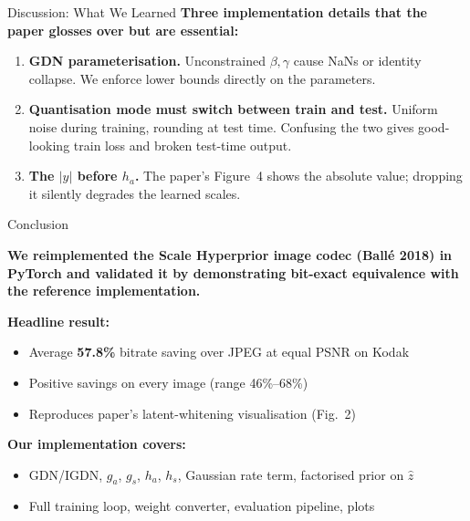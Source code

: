 \documentclass[aspectratio=169, 12pt]{beamer}
\begin{document}
\begin{frame}{Discussion: What We Learned}
    \textbf{Three implementation details that the paper glosses over but are essential:}
    \begin{enumerate}
        \setlength\itemsep{0.7em}
        \item \textbf{GDN parameterisation.} Unconstrained $\beta, \gamma$ cause NaNs or identity collapse. We enforce lower bounds directly on the parameters.
        \item \textbf{Quantisation mode must switch between train and test.} Uniform noise during training, rounding at test time. Confusing the two gives good-looking train loss and broken test-time output.
        \item \textbf{The $|y|$ before $h_a$.} The paper's Figure~4 shows the absolute value; dropping it silently degrades the learned scales.
    \end{enumerate}
\end{frame}

\begin{frame}{Conclusion}
    \begin{keypoint}
    \textbf{We reimplemented the Scale Hyperprior image codec (Ball\'e 2018) in PyTorch and validated it by demonstrating bit-exact equivalence with the reference implementation.}
    \end{keypoint}

    \vspace{0.3cm}
    \textbf{Headline result:}
    \begin{itemize}
        \setlength\itemsep{0.5em}
        \item Average \textbf{57.8\%} bitrate saving over JPEG at equal PSNR on Kodak
        \item Positive savings on every image (range 46\%--68\%)
        \item Reproduces paper's latent-whitening visualisation (Fig.\ 2)
    \end{itemize}

    \vspace{0.2cm}
    \textbf{Our implementation covers:}
    \begin{itemize}
        \item GDN/IGDN, $g_a$, $g_s$, $h_a$, $h_s$, Gaussian rate term, factorised prior on $\hat z$
        \item Full training loop, weight converter, evaluation pipeline, plots
    \end{itemize}
\end{frame}
\end{document}
